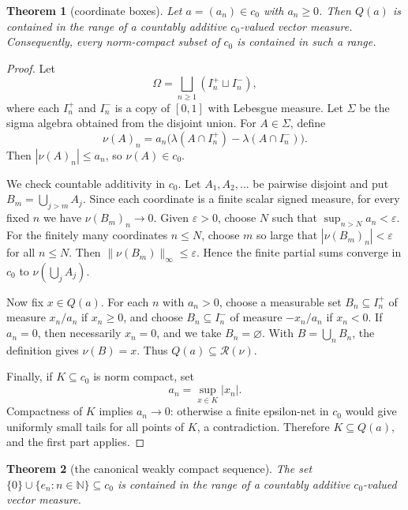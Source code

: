\documentclass[11pt]{article}
\newtheorem{theorem}{Theorem}
\newcommand{\N}{\mathbb N}
\newcommand{\Range}{\mathcal R}
\begin{document}
\begin{theorem}[coordinate boxes]
Let \(a=(a_n)\in c_0\) with \(a_n\ge0\). Then \(Q(a)\) is contained in the
range of a countably additive \(c_0\)-valued vector measure. Consequently,
every norm-compact subset of \(c_0\) is contained in such a range.
\end{theorem}

\begin{proof}
Let
\[
\Omega=\bigsqcup_{n\ge1}(I_n^+\sqcup I_n^-),
\]
where each \(I_n^+\) and \(I_n^-\) is a copy of \([0,1]\) with Lebesgue
measure. Let \(\Sigma\) be the sigma algebra obtained from the disjoint union.
For \(A\in\Sigma\), define
\[
\nu(A)_n=a_n\bigl(\lambda(A\cap I_n^+)-\lambda(A\cap I_n^-)\bigr).
\]
Then \(|\nu(A)_n|\le a_n\), so \(\nu(A)\in c_0\).

We check countable additivity in \(c_0\). Let \(A_1,A_2,\ldots\) be pairwise
disjoint and put \(B_m=\bigcup_{j>m}A_j\). Since each coordinate is a finite
scalar signed measure, for every fixed \(n\) we have \(\nu(B_m)_n\to0\). Given
\(\varepsilon>0\), choose \(N\) such that \(\sup_{n>N}a_n<\varepsilon\). For
the finitely many coordinates \(n\le N\), choose \(m\) so large that
\(|\nu(B_m)_n|<\varepsilon\) for all \(n\le N\). Then
\(\|\nu(B_m)\|_\infty\le\varepsilon\). Hence the finite partial sums converge
in \(c_0\) to \(\nu(\bigcup_jA_j)\).

Now fix \(x\in Q(a)\). For each \(n\) with \(a_n>0\), choose a measurable
set \(B_n\subseteq I_n^+\) of measure \(x_n/a_n\) if \(x_n\ge0\), and choose
\(B_n\subseteq I_n^-\) of measure \(-x_n/a_n\) if \(x_n<0\). If \(a_n=0\),
then necessarily \(x_n=0\), and we take \(B_n=\varnothing\). With
\(B=\bigcup_nB_n\), the definition gives \(\nu(B)=x\). Thus
\(Q(a)\subseteq\Range(\nu)\).

Finally, if \(K\subseteq c_0\) is norm compact, set
\[
a_n=\sup_{x\in K}|x_n|.
\]
Compactness of \(K\) implies \(a_n\to0\): otherwise a finite epsilon-net in
\(c_0\) would give uniformly small tails for all points of \(K\), a
contradiction. Therefore \(K\subseteq Q(a)\), and the first part applies.
\end{proof}

\begin{theorem}[the canonical weakly compact sequence]
The set \(\{0\}\cup\{e_n:n\in\N\}\subseteq c_0\) is contained in the range of
a countably additive \(c_0\)-valued vector measure.
\end{theorem}
\end{document}

